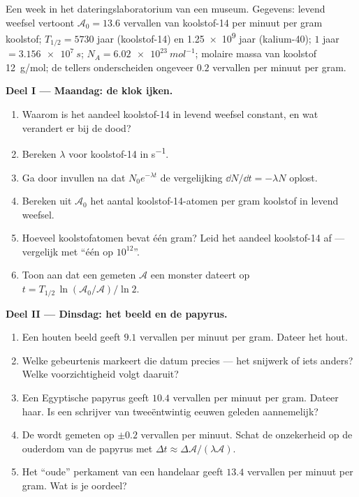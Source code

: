 \begin{problem}
\label{pb:g12:radioactive-decay:1}
Een week in het dateringslaboratorium van een museum. Gegevens: levend weefsel
vertoont $\mathcal A_0 = 13.6$ vervallen van koolstof-14 per minuut per gram
koolstof; $T_{1/2} = \num{5730}$ jaar (koolstof-14) en \num{1.25e9} jaar
(kalium-40); $1$ jaar $= \qty{3.156e7}{s}$;
$N_A = \qty{6.02e23}{mol^{-1}}$; molaire massa van koolstof \qty{12}{g/mol};
de tellers onderscheiden ongeveer $0.2$ vervallen per minuut per gram.

\medskip
\noindent\textbf{Deel I --- Maandag: de klok ijken.}
\begin{enumerate}
  \item Waarom is het aandeel koolstof-14 in levend weefsel constant, en wat
        verandert er bij de dood?
  \item Bereken $\lambda$ voor koolstof-14 in \unit{s^{-1}}.
  \item Ga door invullen na dat $N_0 e^{-\lambda t}$ de vergelijking
        $\dd N/\dd t = -\lambda N$ oplost.
  \item Bereken uit $\mathcal A_0$ het aantal koolstof-14-atomen per gram
        koolstof in levend weefsel.
  \item Hoeveel koolstofatomen bevat één gram? Leid het aandeel koolstof-14
        af --- vergelijk met ``één op $10^{12}$''.
  \item Toon aan dat een gemeten  $\mathcal A$ een monster dateert
        op $t = T_{1/2}\,\ln(\mathcal A_0/\mathcal A)/\ln 2$.
\end{enumerate}

\medskip
\noindent\textbf{Deel II --- Dinsdag: het beeld en de papyrus.}
\begin{enumerate}[resume]
  \item Een houten beeld geeft $9.1$ vervallen per minuut per gram. Dateer het
        hout.
  \item Welke gebeurtenis markeert die datum precies --- het snijwerk of iets
        anders? Welke voorzichtigheid volgt daaruit?
  \item Een Egyptische papyrus geeft $10.4$ vervallen per minuut per gram.
        Dateer haar. Is een schrijver van tweeëntwintig eeuwen geleden
        aannemelijk?
  \item De  wordt gemeten op $\pm 0.2$ vervallen per minuut. Schat de
        onzekerheid op de ouderdom van de papyrus met
        $\Delta t \approx \Delta\mathcal A/(\lambda \mathcal A)$.
  \item Het ``oude'' perkament van een handelaar geeft $13.4$ vervallen per
        minuut per gram. Wat is je oordeel?
\end{enumerate}


\end{problem}
